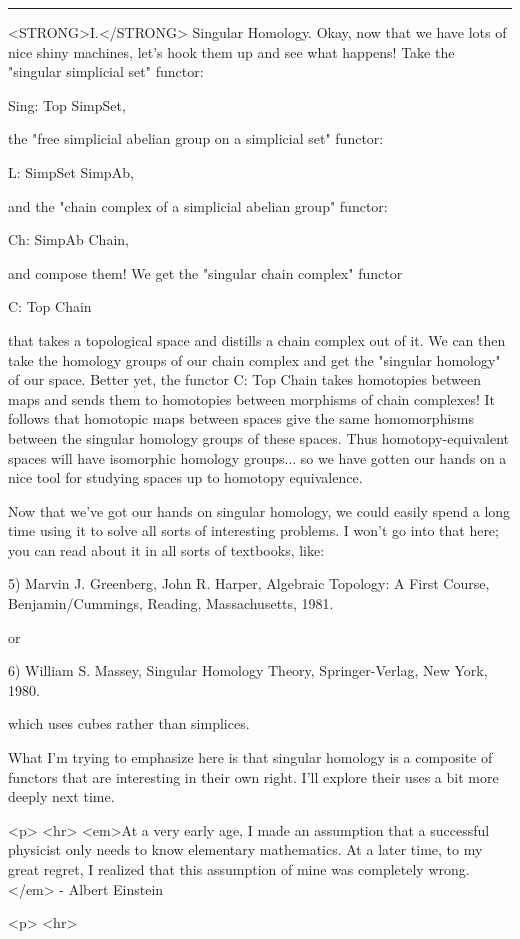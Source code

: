 \par\noindent\rule{\textwidth}{0.4pt}
<STRONG>I.</STRONG>  Singular Homology.  Okay, now that we have lots of nice shiny
machines, let's hook them up and see what happens!  Take the "singular
simplicial set" functor:

                   Sing: Top \to  SimpSet, 

the "free simplicial abelian group on a simplicial set" functor:

                   L: SimpSet \to  SimpAb,

and the "chain complex of a simplicial abelian group" functor:

                   Ch: SimpAb \to  Chain,

and compose them!  We get the "singular chain complex" functor

                   C: Top \to  Chain

that takes a topological space and distills a chain complex out of it.
We can then take the homology groups of our chain complex and get the
"singular homology" of our space.  Better yet, the functor C: Top \to 
Chain takes homotopies between maps and sends them to homotopies between
morphisms of chain complexes!  It follows that homotopic maps between
spaces give the same homomorphisms between the singular homology groups
of these spaces.  Thus homotopy-equivalent spaces will have isomorphic
homology groups... so we have gotten our hands on a nice tool for
studying spaces up to homotopy equivalence.

Now that we've got our hands on singular homology, we could easily spend
a long time using it to solve all sorts of interesting problems.  I
won't go into that here; you can read about it in all sorts of
textbooks, like:

5) Marvin J. Greenberg, John R. Harper, Algebraic Topology: A First Course,
Benjamin/Cummings, Reading, Massachusetts, 1981.

or

6) William S. Massey, Singular Homology Theory, Springer-Verlag, New York,
1980.

which uses cubes rather than simplices.  

What I'm trying to emphasize here is that singular homology is a
composite of functors that are interesting in their own right.  I'll
explore their uses a bit more deeply next time.


<p> <hr>
<em>At a very early age, I made an assumption that a successful
physicist only needs to know elementary mathematics.  At a later time,
to my great regret, I realized that this assumption of mine was
completely wrong.</em> - Albert Einstein





<p> <hr>



